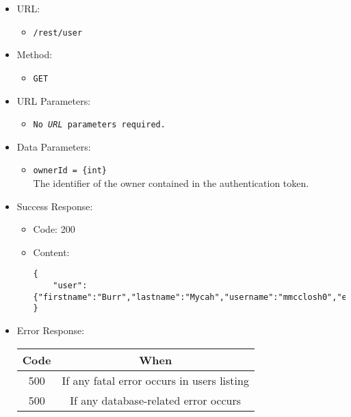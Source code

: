 \begin{itemize}

    \item URL:
    \begin{itemize}
        \item \texttt{/rest/user}
    \end{itemize}

    \item Method:
    \begin{itemize}
        \item \texttt{GET}
    \end{itemize}

    \item URL Parameters:
    \begin{itemize}
        \item \texttt{No \textit{URL} parameters required.}
    \end{itemize}

    \item Data Parameters:
    \begin{itemize}
        \item \texttt{ownerId = \{int\}} \\
        The identifier of the owner contained in the authentication token.
    \end{itemize}

    \item Success Response:
    \begin{itemize}
        \item Code: 200
        \item Content:
        \begin{lstlisting}
{
    "user":{"firstname":"Burr","lastname":"Mycah","username":"mmcclosh0","email":"mchaudret0@dailymail.co.uk","telegram_chat_id":null}
}
        \end{lstlisting}
    \end{itemize}

    \item Error Response:
    \begin{table}[!h]
    \centering
    \begin{tabular}{|c|c|}
    \hline
    \multicolumn{1}{|c|}{\textbf{Code}} & \multicolumn{1}{c|}{\textbf{When}} \\ \hline
    500 & If any fatal error occurs in users listing \\\hline
    500 & If any database-related error occurs \\\hline
    \end{tabular}
    \end{table}

\end{itemize}


